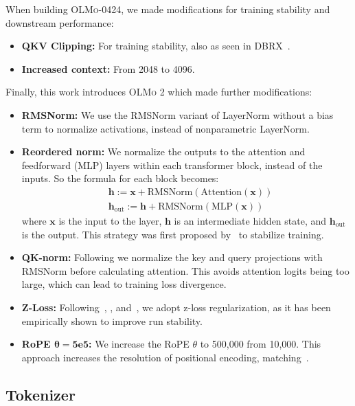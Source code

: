 \documentclass[table]{ai2style/ai2}
\newcommand{\olmoapril}{\textsc{OLMo-0424}\xspace}
\newcommand{\olmotoo}{\textsc{OLMo 2}\xspace}
\begin{document}
When building \olmoapril, we made modifications for training stability and downstream performance: 
\begin{itemize}
    \item \textbf{QKV Clipping:} For training stability, also as seen in DBRX~\citep{dbrx_blog}.
    \item \textbf{Increased context:} From 2048 to 4096.
\end{itemize}

Finally, this work introduces \olmotoo which made further modifications:

\begin{itemize}
    \item \textbf{RMSNorm:} We use the RMSNorm \citep{RMSNorm} variant of LayerNorm \citep{Ba2016LayerNorm} without a bias term to normalize activations, instead of nonparametric LayerNorm.
    \item \textbf{Reordered norm:} We normalize the outputs to the attention and feedforward (MLP) layers within each transformer block, instead of the inputs. So the formula for each block becomes:
    \begin{align}
        & \pmb{h}  := \pmb{x} + \text{RMSNorm}(\text{Attention}(\pmb{x})) \\
        & \pmb{h}_{\text{out}}  := \pmb{h} + \text{RMSNorm}(\text{MLP}(\pmb{x}))
    \end{align}
    where $\pmb{x}$ is the input to the layer, $\pmb{h}$ is an intermediate hidden state, and $\pmb{h}_{\text{out}}$ is the output.
    This strategy was first proposed by~\citet{swin2} to stabilize training.
    \item \textbf{QK-norm:} Following \cite{Dehghani2023ScalingVT} we normalize the key and query projections with RMSNorm before calculating attention. This avoids attention logits being too large, which can lead to training loss divergence.
    \item \textbf{Z-Loss:} Following~\citet{palm}, \citet{chameleon}, and~\citet{mitch}, we adopt z-loss regularization, as it has been empirically shown to improve run stability. 
    \item \textbf{RoPE $\pmb{\theta = 5e5}$:} We increase the RoPE $\theta$ to 500,000 from 10,000. This approach increases the resolution of positional encoding, matching~\citet{dubey2024llama}.
\end{itemize}

\subsection{Tokenizer}
\end{document}

